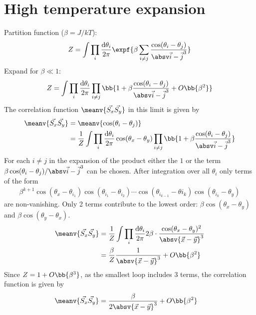 \section{High temperature expansion}
Partition function ($\beta = J/kT$):
\begin{align}
Z=\int\prod_{i} \frac{\text{d}\theta_i}{2\pi}  \expf{\beta \suminj \frac{\cos(\theta_i - \theta_j)}{\aij}}
\end{align}
Expand for $\beta \ll 1$:
\begin{align}
Z=\int\prod_{i} \frac{\text{d}\theta_i}{2\pi}  \prod_{i\ne j}  \bb{1 + \beta \frac{\cos(\theta_i - \theta_j)}{\aij} + O\bb{\beta^2}}
\end{align}
The correlation function $\meanv{\vec{S_x} \vec{S_y}}$ in this limit is given by
\begin{align}
\meanv{\vec{S_x} \vec{S_y}} &= \meanv{\cos(\theta_i - \theta_j)} \\ &= \frac{1}{Z} \int\prod_{i} \frac{\text{d}\theta_i}{2\pi}  \cos(\theta_x - \theta_y)
\prod_{i\ne j}  \bb{1 + \beta \frac{\cos(\theta_i - \theta_j)}{\aij}}
\end{align}
For each $i\ne j$ in the expansion of the product either the $1$ or the term $\beta \cos(\theta_i - \theta_j)/\aij$ can be chosen. After integration over all $\theta_i$ only terms of the form
\begin{align}
\beta^{k+1} \cos(\theta_x - \theta_{i_1}) \cos(\theta_{i_1} - \theta_{i_2}) \cdots \cos(\theta_{i_{k-1}}-\theta{i_k})\cos(\theta_{i_k} - \theta_y)
\end{align}
are non-vanishing. Only 2 terms contribute to the lowest order: $\beta \cos(\theta_x - \theta_y)$ and $\beta \cos(\theta_y - \theta_x)$.
\begin{align}
\meanv{\vec{S_x} \vec{S_y}} &= \frac{1}{Z} \int\prod_{i} \frac{\text{d}\theta_i}{2\pi} 2 \beta \cdot \frac{\cos(\theta_x - \theta_y)^2}{\absv{\vec{x}-\vec{y}}^3} \\
&= \frac{\beta}{Z} \frac{1}{\absv{\vec{x}-\vec{y}}^3} + O\bb{\beta^2}
\end{align}
Since $Z = 1+O\bb{\beta^3}$, as the smallest loop includes 3 terms, the correlation function is given by
\begin{align}
\meanv{\vec{S_x} \vec{S_y}} &= \frac{\beta}{2\absv{\vec{x}-\vec{y}}^3} + O\bb{\beta^2}
\end{align}

